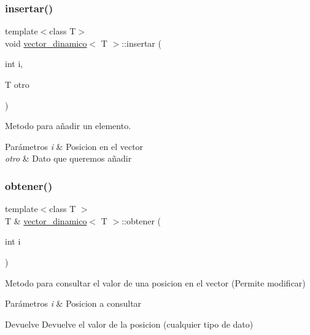 \subsubsection{\texorpdfstring{insertar()}{insertar()}}
{\footnotesize\ttfamily template$<$class T$>$ \\
void \hyperlink{classvector__dinamico}{vector\+\_\+dinamico}$<$ T $>$\+::insertar (\begin{DoxyParamCaption}\item[{int}]{i,  }\item[{T}]{otro }\end{DoxyParamCaption})}



Metodo para añadir un elemento. 


\begin{DoxyParams}{Parámetros}
{\em i} & Posicion en el vector \\
\hline
{\em otro} & Dato que queremos añadir \\
\hline
\end{DoxyParams}
\mbox{\label{classvector__dinamico_adfa7701af640b85c9c1642e54df903e4}} 
\subsubsection{\texorpdfstring{obtener()}{obtener()}}
{\footnotesize\ttfamily template$<$class T $>$ \\
T \& \hyperlink{classvector__dinamico}{vector\+\_\+dinamico}$<$ T $>$\+::obtener (\begin{DoxyParamCaption}\item[{int}]{i }\end{DoxyParamCaption})}



Metodo para consultar el valor de una posicion en el vector (Permite modificar) 


\begin{DoxyParams}{Parámetros}
{\em i} & Posicion a consultar \\
\hline
\end{DoxyParams}
\begin{DoxyReturn}{Devuelve}
Devuelve el valor de la posicion (cualquier tipo de dato) 
\end{DoxyReturn}
\mbox{\label{classvector__dinamico_aa13f55271edd171d4dd4c203efb0c697}} 
